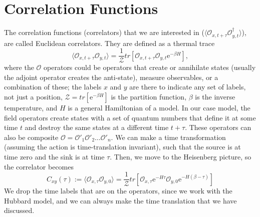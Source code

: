 \section{Correlation Functions}
\label{sec:corr_func}

The correlation functions (correlators) that we are interested in ($\langle \mathcal{O}_{x,t+\tau}\mathcal{O}^\dagger_{y,t} \rangle$), are called Euclidean correlators. They are defined as a thermal trace
\begin{equation}
    \langle \mathcal{O}_{x,t+\tau}\mathcal{O}_{y,t} \rangle = \frac{1}{\mathcal{Z}}tr\left[ \mathcal{O}_{x,t+\tau}\mathcal{O}_{y,t}\mathrm{e}^{-\beta H} \right],
    \label{eq:corr_trerm}
\end{equation}
where the $\mathcal{O}$ operators could be operators that create or annihilate states (usually the adjoint operator creates the anti-state), measure observables, or a combination of these; the labels $x$ and $y$ are there to indicate any set of labels, not just a position, $\mathcal{Z} = tr\left[ \mathrm{e}^{-\beta H} \right]$ is the partition function, $\beta$ is the inverse temperature, and $H$ is a general Hamiltonian of a model. In our case model, the field operators create states with a set of quantum numbers that define it at some time $t$ and destroy the same states at a different time $t + \tau$. These operators can also be composite $\mathcal{O} = \mathcal{O'}_1\mathcal{O'}_2\hdots\mathcal{O'}_n$. We can make a time transformation (assuming the action is time-translation invariant), such that the source is at time zero and the sink is at time $\tau$. Then, we move to the Heisenberg picture, so the correlator becomes
\begin{equation}
    C_{xy}(\tau) := \langle \mathcal{O}_{x,\tau}\mathcal{O}_{y,0} \rangle = \frac{1}{\mathcal{Z}}tr\left[ \mathcal{O}_{x,\tau}\mathrm{e}^{-H\tau}\mathcal{O}_{y,0}\mathrm{e}^{-H(\beta - \tau)} \right]
\end{equation}
We drop the time labels that are on the operators, since we work with the Hubbard model, and we can always make the time translation that we have discussed.

